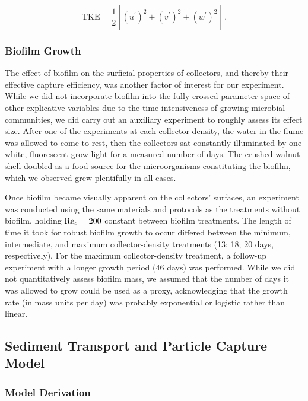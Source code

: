 \documentclass[geosciences,article,submit,moreauthors,pdftex]{Definitions/mdpi}
\begin{document}
\begin{equation}
    \text{TKE} = \frac{1}{2}[\overline{(u^\prime)^2} + \overline{(v^\prime)^2} + \overline{(w^\prime)^2}]\,.
    \label{eqn:TKE}
\end{equation}

\subsubsection{Biofilm Growth}

The effect of biofilm on the surficial properties of collectors, and thereby their effective capture efficiency, was another factor of interest for our experiment. While we did not incorporate biofilm into the fully-crossed parameter space of other explicative variables due to the time-intensiveness of growing microbial communities, we did carry out an auxiliary experiment to roughly assess its effect size. After one of the experiments at each collector density, the water in the flume was allowed to come to rest, then the collectors sat constantly illuminated by one white, fluorescent grow-light for a measured number of days. The crushed walnut shell doubled as a food source for the microorganisms constituting the biofilm, which we observed grew plentifully in all cases.

Once biofilm became visually apparent on the collectors' surfaces, an experiment was conducted using the same materials and protocols as the treatments without biofilm, holding $\mathrm{Re}_c = 200$ constant between biofilm treatments. The length of time it took for robust biofilm growth to occur differed between the minimum, intermediate, and maximum collector-density treatments (13; 18; 20 days, respectively). For the maximum collector-density treatment, a follow-up experiment with a longer growth period (46 days) was performed. While we did not quantitatively assess biofilm mass, we assumed that the number of days it was allowed to grow could be used as a proxy, acknowledging that the growth rate (in mass units per day) was probably exponential or logistic rather than linear.

\subsection{Sediment Transport and Particle Capture Model}

\subsubsection{Model Derivation}
\end{document}
